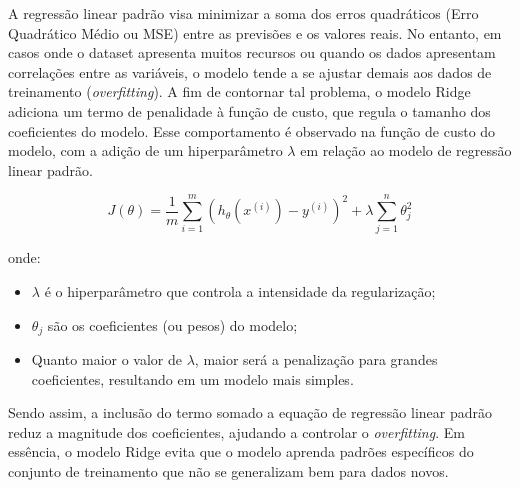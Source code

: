 A regressão linear padrão visa minimizar a soma dos erros quadráticos (Erro Quadrático Médio ou MSE) entre as previsões e os valores reais. No entanto, em casos onde o dataset apresenta muitos recursos ou quando os dados apresentam correlações entre as variáveis, o modelo tende a se ajustar demais aos dados de treinamento (\textit{overfitting}). A fim de contornar tal problema, o modelo Ridge adiciona um termo de penalidade à função de custo, que regula o tamanho dos coeficientes do modelo. Esse comportamento é observado na função de custo do modelo, com a adição de um hiperparâmetro $\lambda$ em relação ao modelo de regressão linear padrão.

\begin{equation}
    J(\theta) = \frac{1}{m}\sum_{i=1}^{m}\left(h_{\theta}(x^{(i)})- y^{(i)}\right)^2 + \lambda\sum_{j=1}^{n}\theta^{2}_{j}
\end{equation}

onde:

\begin{itemize}
    \item $\lambda$ é o hiperparâmetro que controla a intensidade da regularização;
    \item $\theta_{j}$ são os coeficientes (ou pesos) do modelo;
    \item Quanto maior o valor de $\lambda$, maior será a penalização para grandes coeficientes, resultando em um modelo mais simples.
\end{itemize}

Sendo assim, a inclusão do termo somado a equação de regressão linear padrão reduz a magnitude dos coeficientes, ajudando a controlar o \textit{overfitting}. Em essência, o modelo Ridge evita que o modelo aprenda padrões específicos do conjunto de treinamento que não se generalizam bem para dados novos.



